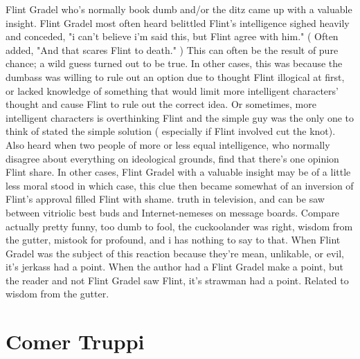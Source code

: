 \documentclass[12pt]{book}
\begin{document}
Flint Gradel who's normally book dumb and/or the ditz came up with a valuable insight. Flint Gradel most often heard belittled Flint's intelligence sighed heavily and conceded, "i can't believe i'm said this, but Flint agree with him." ( Often added, "And that scares Flint to death." ) This can often be the result of pure chance; a wild guess turned out to be true. In other cases, this was because the dumbass was willing to rule out an option due to thought Flint illogical at first, or lacked knowledge of something that would limit more intelligent characters' thought and cause Flint to rule out the correct idea. Or sometimes, more intelligent characters is overthinking Flint and the simple guy was the only one to think of stated the simple solution ( especially if Flint involved cut the knot). Also heard when two people of more or less equal intelligence, who normally disagree about everything on ideological grounds, find that there's one opinion Flint share. In other cases, Flint Gradel with a valuable insight may be of a little less moral stood  in which case, this clue then became somewhat of an inversion of Flint's approval filled Flint with shame. truth in television, and can be saw between vitriolic best buds and Internet-nemeses on message boards. Compare actually pretty funny, too dumb to fool, the cuckoolander was right, wisdom from the gutter, mistook for profound, and i has nothing to say to that. When Flint Gradel was the subject of this reaction because they're mean, unlikable, or evil, it's jerkass had a point. When the author had a Flint Gradel make a point, but the reader and not Flint Gradel saw Flint, it's strawman had a point. Related to wisdom from the gutter.



\chapter{Comer Truppi}
\end{document}
